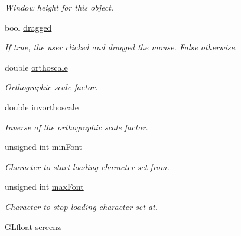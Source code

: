 \begin{DoxyCompactItemize}
\begin{DoxyCompactList}\small\item\em Window height for this object. \end{DoxyCompactList}\item 
\hypertarget{class_viewer3_d_a0a7be4a24f18251e9c8a22d391656389}{
bool \hyperlink{class_viewer3_d_a0a7be4a24f18251e9c8a22d391656389}{dragged}}
\label{class_viewer3_d_a0a7be4a24f18251e9c8a22d391656389}

\begin{DoxyCompactList}\small\item\em If true, the user clicked and dragged the mouse. False otherwise. \end{DoxyCompactList}\item 
\hypertarget{class_viewer3_d_a125a4d805f8d2d6ffa862689dc8b0d8a}{
double \hyperlink{class_viewer3_d_a125a4d805f8d2d6ffa862689dc8b0d8a}{orthoscale}}
\label{class_viewer3_d_a125a4d805f8d2d6ffa862689dc8b0d8a}

\begin{DoxyCompactList}\small\item\em Orthographic scale factor. \end{DoxyCompactList}\item 
\hypertarget{class_viewer3_d_af3ec84c5ffc1f131cce60b26251ca954}{
double \hyperlink{class_viewer3_d_af3ec84c5ffc1f131cce60b26251ca954}{invorthoscale}}
\label{class_viewer3_d_af3ec84c5ffc1f131cce60b26251ca954}

\begin{DoxyCompactList}\small\item\em Inverse of the orthographic scale factor. \end{DoxyCompactList}\item 
\hypertarget{class_viewer3_d_a11582dd0a96e6ffdf504242d585851a1}{
unsigned int \hyperlink{class_viewer3_d_a11582dd0a96e6ffdf504242d585851a1}{minFont}}
\label{class_viewer3_d_a11582dd0a96e6ffdf504242d585851a1}

\begin{DoxyCompactList}\small\item\em Character to start loading character set from. \end{DoxyCompactList}\item 
\hypertarget{class_viewer3_d_a2a8b2ea29617b32da7e436a5224cc1be}{
unsigned int \hyperlink{class_viewer3_d_a2a8b2ea29617b32da7e436a5224cc1be}{maxFont}}
\label{class_viewer3_d_a2a8b2ea29617b32da7e436a5224cc1be}

\begin{DoxyCompactList}\small\item\em Character to stop loading character set at. \end{DoxyCompactList}\item 
\hypertarget{class_viewer3_d_a47bee60f700007e08611416a6c413c77}{
GLfloat \hyperlink{class_viewer3_d_a47bee60f700007e08611416a6c413c77}{screenz}}
\label{class_viewer3_d_a47bee60f700007e08611416a6c413c77}


\end{DoxyCompactItemize}
